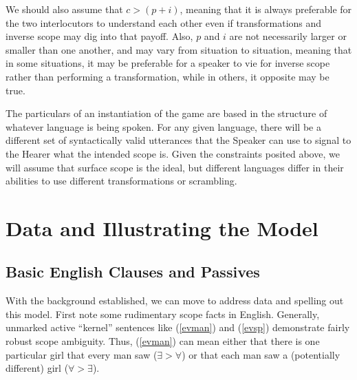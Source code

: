 \documentclass{article}
\begin{document}
We should also assume that $c > (p + i)$, meaning that it is always preferable for the two interlocutors to understand each other even if transformations and inverse scope may dig into that payoff.
Also, $p$ and $i$ are not necessarily larger or smaller than one another, and may vary from situation to situation, meaning that in some situations, it may be preferable for a speaker to vie for inverse scope rather than performing a transformation, while in others, it opposite may be true.

The particulars of an instantiation of the game are based in the structure of whatever language is being spoken.
For any given language, there will be a different set of syntactically valid utterances that the Speaker can use to signal to the Hearer what the intended scope is.
Given the constraints posited above, we will assume that surface scope is the ideal, but different languages differ in their abilities to use different transformations or scrambling.


\begin{figure}
\begin{center}
\end{center}
\end{figure}
\section{Data and Illustrating the Model}

\subsection{Basic English Clauses and Passives\label{eng}}

With the background established, we can move to address data and spelling out this model.
First note some rudimentary scope facts in English.
Generally, unmarked active ``kernel'' sentences like (\ref{evman}) and (\ref{evsp}) demonstrate fairly robust scope ambiguity.
Thus, (\ref{evman}) can mean either that there is one particular girl that every man saw ($\exists>\forall$) or that each man saw a (potentially different) girl ($\forall>\exists$).
\end{document}
